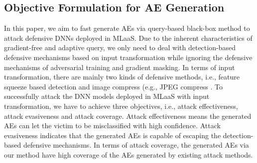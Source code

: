 \documentclass[lettersize,journal]{IEEEtran}
\begin{document}
%
	
	
	
	\subsection{Objective Formulation for AE Generation}
	In this paper, we aim to fast generate AEs via query-based black-box method to attack defensive DNNs deployed in MLaaS. Due to the inherent characteristics of gradient-free and adaptive query, we only need to deal with detection-based defensive mechanisms based on input transformation while ignoring the defensive mechanisms of adversarial training and gradient masking. In terms of input transformation, there are mainly two kinds of defensive methods, i.e., feature squeeze based detection \cite{DBLP:conf/ndss/Xu0Q18} and image compress (e.g., JPEG compress \cite{Liu_2019_CVPR}. To successfully attack the DNN models deployed in MLaaS with input transformation, we have to achieve three objectives, i.e., attack effectiveness, attack evasiveness and attack coverage. Attack effectiveness means the generated AEs can let the victim to be misclassified with high confidence. Attack evasiveness indicates that the generated AEs is capable of escaping the detection-based defensive mechanisms. In terms of attack coverage, the generated AEs via our method have high coverage of the AEs generated by existing attack methods.
	
\end{document}
